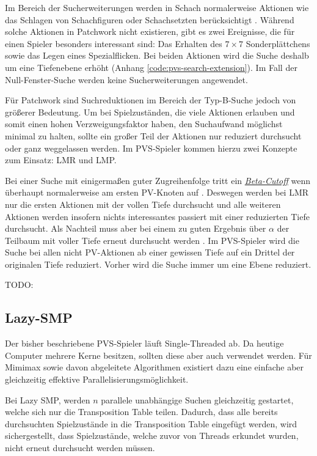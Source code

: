 Im Bereich der Sucherweiterungen werden in Schach normalerweise Aktionen wie das Schlagen von Schachfiguren oder Schachsetzten berücksichtigt \cite[S. 14]{1950.ChessShannon}\cite{2023.StockfishTerminology}\cite{2003.SearchExtensions}. Während solche Aktionen in Patchwork nicht existieren, gibt es zwei Ereignisse, die für einen Spieler besonders interessant sind: Das Erhalten des $7\times 7$ Sonderplättchens sowie das Legen eines Spezialflicken. Bei beiden Aktionen wird die Suche deshalb um eine Tiefenebene erhöht (Anhang \ref{code:pvs-search-extension}). Im Fall der Null-Fenster-Suche werden keine Sucherweiterungen angewendet.

Für Patchwork sind Suchreduktionen im Bereich der Typ-B-Suche jedoch von größerer Bedeutung. Um bei Spielzuständen, die viele Aktionen erlauben und somit einen hohen Verzweigungsfaktor haben, den Suchaufwand möglichst minimal zu halten, sollte ein großer Teil der Aktionen nur reduziert durchsucht oder ganz weggelassen werden. Im \ac{PVS}-Spieler kommen hierzu zwei Konzepte zum Einsatz: \ac{LMR} und \ac{LMP}.

Bei einer Suche mit einigermaßen guter Zugreihenfolge tritt ein \hyperref[text:beta-cutoff]{\emph{Beta-Cutoff}} wenn überhaupt normalerweise am ersten \acs{PV}-Knoten auf \cite{2007.LMR}. Deswegen werden bei \ac{LMR} nur die ersten Aktionen mit der vollen Tiefe durchsucht und alle weiteren Aktionen werden insofern nichts interessantes passiert mit einer reduzierten Tiefe durchsucht. Als Nachteil muss aber bei einem zu guten Ergebnis über $\alpha$ der Teilbaum mit voller Tiefe erneut durchsucht werden \cite{2007.LMR}. Im \ac{PVS}-Spieler wird die Suche bei allen nicht \ac{PV}-Aktionen ab einer gewissen Tiefe auf ein Drittel der originalen Tiefe reduziert. Vorher wird die Suche immer um eine Ebene reduziert.

TODO:

\subsection{Lazy-SMP}

Der bisher beschriebene \ac{PVS}-Spieler läuft Single-Threaded ab. Da heutige Computer mehrere Kerne besitzen, sollten diese aber auch verwendet werden. Für Mimimax sowie davon abgeleitete Algorithmen existiert dazu eine einfache aber gleichzeitig effektive Parallelisierungsmöglichkeit.

Bei Lazy \ac{SMP}, werden $n$ parallele unabhängige Suchen gleichzeitig gestartet, welche sich nur die Transposition Table teilen. Dadurch, dass alle bereits durchsuchten Spielzustände in die Transposition Table eingefügt werden, wird sichergestellt, dass Spielzustände, welche zuvor von Threads erkundet wurden, nicht erneut durchsucht werden müssen.

